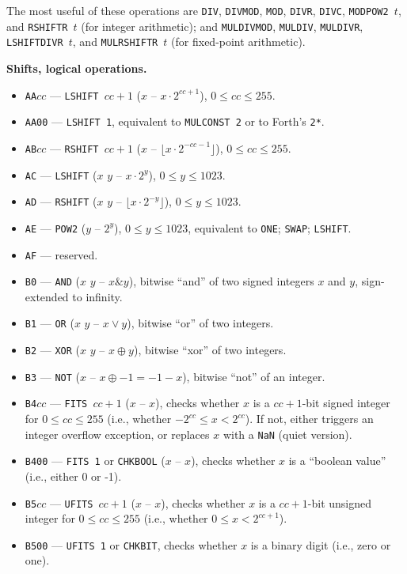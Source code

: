 \documentclass[12pt,oneside]{article}
\def\makepoint#1{\medbreak\noindent{\bf #1.\ }}
\def\nxsubpoint{\refstepcounter{subsubsection}%
  \smallbreak\makepoint{\thesubsubsection}}
\def\emb#1{\textbf{#1.}}
\begin{document}
The most useful of these operations are {\tt DIV}, {\tt DIVMOD}, {\tt MOD}, {\tt DIVR}, {\tt DIVC}, {\tt MODPOW2 $t$}, and {\tt RSHIFTR $t$} (for integer arithmetic); and {\tt MULDIVMOD}, {\tt MULDIV}, {\tt MULDIVR}, {\tt LSHIFTDIVR $t$}, and {\tt MULRSHIFTR $t$} (for fixed-point arithmetic).

\nxsubpoint\emb{Shifts, logical operations}
\begin{itemize}
\item {\tt AA$cc$} --- {\tt LSHIFT $cc+1$} ($x$ -- $x\cdot2^{cc+1}$), $0\leq cc\leq255$.
\item {\tt AA00} --- {\tt LSHIFT 1}, equivalent to {\tt MULCONST 2} or to Forth's {\tt 2*}.
\item {\tt AB$cc$} --- {\tt RSHIFT $cc+1$} ($x$ -- $\lfloor x\cdot2^{-cc-1}\rfloor$), $0\leq cc\leq255$.
\item {\tt AC} --- {\tt LSHIFT} ($x$ $y$ -- $x\cdot 2^y$), $0\leq y\leq 1023$.
\item {\tt AD} --- {\tt RSHIFT} ($x$ $y$ -- $\lfloor x\cdot 2^{-y}\rfloor$), $0\leq y\leq 1023$.
\item {\tt AE} --- {\tt POW2} ($y$ -- $2^y$), $0\leq y\leq1023$, equivalent to {\tt ONE}; {\tt SWAP}; {\tt LSHIFT}.
\item {\tt AF} --- reserved.
\item {\tt B0} --- {\tt AND} ($x$ $y$ -- $x\&y$), bitwise ``and'' of two signed integers $x$ and $y$, sign-extended to infinity.
\item {\tt B1} --- {\tt OR} ($x$ $y$ -- $x\vee y$), bitwise ``or'' of two integers.
\item {\tt B2} --- {\tt XOR} ($x$ $y$ -- $x\oplus y$), bitwise ``xor'' of two integers.
\item {\tt B3} --- {\tt NOT} ($x$ -- $x\oplus-1=-1-x$), bitwise ``not'' of an integer.
\item {\tt B4$cc$} --- {\tt FITS $cc+1$} ($x$ -- $x$), checks whether $x$ is a $cc+1$-bit signed integer for $0\leq cc\leq 255$ (i.e., whether $-2^{cc}\leq x<2^{cc}$). If not, either triggers an integer overflow exception, or replaces $x$ with a {\tt NaN} (quiet version).
\item {\tt B400} --- {\tt FITS 1} or {\tt CHKBOOL} ($x$ -- $x$), checks whether $x$ is a ``boolean value'' (i.e., either 0 or -1).
\item {\tt B5$cc$} --- {\tt UFITS $cc+1$} ($x$ -- $x$), checks whether $x$ is a $cc+1$-bit unsigned integer for $0\leq cc\leq 255$ (i.e., whether $0\leq x<2^{cc+1}$).
\item {\tt B500} --- {\tt UFITS 1} or {\tt CHKBIT}, checks whether $x$ is a binary digit (i.e., zero or one).

\end{itemize}
\end{document}
